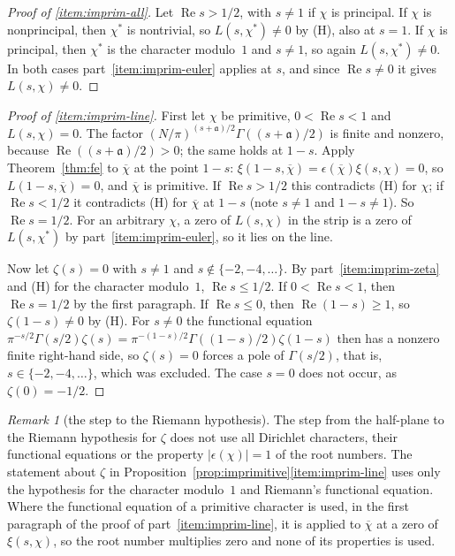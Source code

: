 \documentclass[11pt]{amsbook}
\theoremstyle{plain}
\theoremstyle{definition}
\theoremstyle{remark}
\newtheorem{remark}[theorem]{Remark}
\numberwithin{equation}{section}
\numberwithin{figure}{chapter}
\numberwithin{table}{chapter}
\begin{document}
\begin{proof}[Proof of \ref{item:imprim-all}]
Let $\operatorname{Re}s>1/2$, with $s\ne1$ if $\chi$ is principal. If
$\chi$ is nonprincipal, then $\chi^*$ is nontrivial, so
$L(s,\chi^*)\ne0$ by (H), also at $s=1$. If $\chi$ is principal, then
$\chi^*$ is the character modulo~$1$ and $s\ne1$, so again
$L(s,\chi^*)\ne0$. In both cases part~\ref{item:imprim-euler} applies
at $s$, and since $\operatorname{Re}s\ne0$ it gives $L(s,\chi)\ne0$.
\end{proof}

\begin{proof}[Proof of \ref{item:imprim-line}]
First let $\chi$ be primitive, $0<\operatorname{Re}s<1$ and
$L(s,\chi)=0$. The factor $(N/\pi)^{(s+\mathfrak a)/2}
\Gamma((s+\mathfrak a)/2)$ is finite and nonzero, because
$\operatorname{Re}((s+\mathfrak a)/2)>0$; the same holds at $1-s$.
Apply Theorem~\ref{thm:fe} to $\overline\chi$ at the point $1-s$:
$\xi(1-s,\overline\chi)=\epsilon(\overline\chi)\xi(s,\chi)=0$, so
$L(1-s,\overline\chi)=0$, and $\overline\chi$ is primitive. If
$\operatorname{Re}s>1/2$ this contradicts (H) for $\chi$; if
$\operatorname{Re}s<1/2$ it contradicts (H) for $\overline\chi$ at
$1-s$ (note $s\ne1$ and $1-s\ne1$). So $\operatorname{Re}s=1/2$. For
an arbitrary $\chi$, a zero of $L(s,\chi)$ in the strip is a zero of
$L(s,\chi^*)$ by part~\ref{item:imprim-euler}, so it lies on the line.

Now let $\zeta(s)=0$ with $s\ne1$ and $s\notin\{-2,-4,\dots\}$. By
part~\ref{item:imprim-zeta} and (H) for the character modulo~$1$,
$\operatorname{Re}s\le1/2$. If $0<\operatorname{Re}s<1$, then
$\operatorname{Re}s=1/2$ by the first paragraph. If
$\operatorname{Re}s\le0$, then $\operatorname{Re}(1-s)\ge1$, so
$\zeta(1-s)\ne0$ by (H). For $s\ne0$ the functional equation
$\pi^{-s/2}\Gamma(s/2)\zeta(s)=\pi^{-(1-s)/2}\Gamma((1-s)/2)
\zeta(1-s)$ then has a nonzero finite right-hand side, so
$\zeta(s)=0$ forces a pole of $\Gamma(s/2)$, that is,
$s\in\{-2,-4,\dots\}$, which was excluded. The case $s=0$ does not
occur, as $\zeta(0)=-1/2$.
\end{proof}

\begin{remark}[the step to the Riemann hypothesis]
\label{rem:zeta-suffices}
The step from the half-plane to the Riemann hypothesis for $\zeta$
does not use all Dirichlet characters, their functional equations or
the property $|\epsilon(\chi)|=1$ of the root numbers. The statement
about $\zeta$ in
Proposition~\ref{prop:imprimitive}\ref{item:imprim-line} uses only the
hypothesis for the character modulo~$1$ and Riemann's functional
equation. Where the functional equation of a primitive character is
used, in the first paragraph of the proof of
part~\ref{item:imprim-line}, it is applied to $\overline\chi$ at a
zero of $\xi(s,\chi)$, so the root number multiplies zero and none of
its properties is used.
\end{remark}
\clearpage
\clearpage
\end{document}

